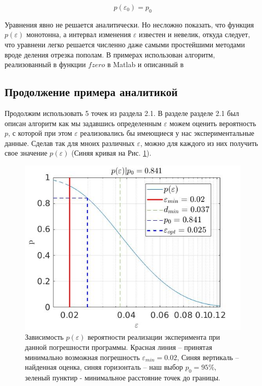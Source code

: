 \documentclass[a4paper,12pt]{article} %
\begin{document}
\begin{equation}
p(\varepsilon_0) = p_0
\end{equation}

Уравнения явно не решается аналитически. Но несложно показать, что функция $p(\varepsilon)$ монотонна, а интервал изменения $\varepsilon$ известен и невелик, откуда следует, что уравнени легко решается численно даже самыми простейшими методами вроде деления отрезка пополам. В примерах использован алгоритм, реализованный в функции $fzero$ в Matlab и описанный в \cite{grund1979forsythe}

\newpage

\subsection{Продолжение примера аналитикой}

Продолжим использовать 5 точек из раздела 2.1. В разделе разделе 2.1 был описан алгоритм как мы задавшись определенным $\varepsilon$ можем оценить вероятность $p$, с которой при этом $\varepsilon$ реализовались бы имеющиеся у нас экспериментальные данные. Сделав так для мноих различных $\varepsilon$, можно для каждого из них получить свое значение $p(\varepsilon)$ (Синяя кривая на Рис. \ref{img:vis}).

\begin{figure}[h!]
\begin{center}
\includegraphics[width=1\textwidth]{./pics/vis}
\end{center}
\caption{Зависимость $p(\varepsilon)$ вероятности реализации эксперимента при данной погрешности программы. Красная линия -- принятая минимально возможная погрешность $\varepsilon_{min} = 0.02$, Синяя вертикаль -- найденная оценка, синяя горизонталь -- наш выбор $p_0 = 95\%$, зеленый пунктир - минимальное расстояние точек до границы.}
\label{img:vis}
\end{figure}
\end{document}
